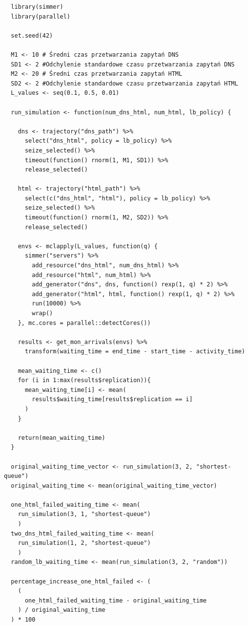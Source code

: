 \documentclass[12pt,oneside,a4paper]{book} %
\theoremstyle{break}
\begin{document}
\begin{small}
\begin{verbatim}
  library(simmer)
  library(parallel)
  
  set.seed(42)
  
  M1 <- 10 # Średni czas przetwarzania zapytań DNS
  SD1 <- 2 #Odchylenie standardowe czasu przetwarzania zapytań DNS
  M2 <- 20 # Średni czas przetwarzania zapytań HTML
  SD2 <- 2 #Odchylenie standardowe czasu przetwarzania zapytań HTML
  L_values <- seq(0.1, 0.5, 0.01)
  
  run_simulation <- function(num_dns_html, num_html, lb_policy) {
  
    dns <- trajectory("dns_path") %>%
      select("dns_html", policy = lb_policy) %>% 
      seize_selected() %>%
      timeout(function() rnorm(1, M1, SD1)) %>%
      release_selected()
  
    html <- trajectory("html_path") %>%
      select(c("dns_html", "html"), policy = lb_policy) %>%
      seize_selected() %>%
      timeout(function() rnorm(1, M2, SD2)) %>%
      release_selected()
  
    envs <- mclapply(L_values, function(q) {
      simmer("servers") %>%
        add_resource("dns_html", num_dns_html) %>%
        add_resource("html", num_html) %>%
        add_generator("dns", dns, function() rexp(1, q) * 2) %>%
        add_generator("html", html, function() rexp(1, q) * 2) %>%
        run(10000) %>%
        wrap()
    }, mc.cores = parallel::detectCores())
  
    results <- get_mon_arrivals(envs) %>% 
      transform(waiting_time = end_time - start_time - activity_time)
  
    mean_waiting_time <- c()
    for (i in 1:max(results$replication)){
      mean_waiting_time[i] <- mean(
        results$waiting_time[results$replication == i]
      )
    }
  
    return(mean_waiting_time)
  }
  
  original_waiting_time_vector <- run_simulation(3, 2, "shortest-queue")
  original_waiting_time <- mean(original_waiting_time_vector)
  
  one_html_failed_waiting_time <- mean(
    run_simulation(3, 1, "shortest-queue")
    )
  two_dns_html_failed_waiting_time <- mean(
    run_simulation(1, 2, "shortest-queue")
    )
  random_lb_waiting_time <- mean(run_simulation(3, 2, "random"))
  
  percentage_increase_one_html_failed <- (
    (
      one_html_failed_waiting_time - original_waiting_time
    ) / original_waiting_time
  ) * 100
  

\end{verbatim}
\end{small}
\end{document}
